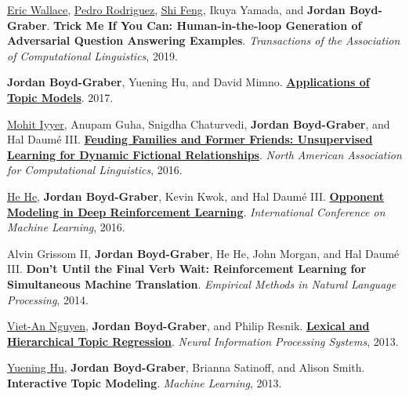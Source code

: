 \documentclass[10pt,a4paper]{article} %
\begin{document}
\begin{multicols}{2}  %

\small

\begin{enumerate*}

\item \underline{\href{http://www.ericswallace.com/}{Eric Wallace}}, \underline{\href{http://csel.cs.colorado.edu/~pero9922}{Pedro Rodriguez}}, \underline{\href{http://users.umiacs.umd.edu/~shifeng/}{Shi Feng}}, Ikuya Yamada, and {\bf Jordan Boyd-Graber}.  {\bf Trick Me If You Can: Human-in-the-loop Generation of Adversarial Question Answering Examples}.  \emph{Transactions of the Association of Computational Linguistics}, 2019.

\item {\bf Jordan Boyd-Graber}, Yuening Hu, and David Mimno.  {\bf \href{http://www.nowpublishers.com/article/Details/INR-030}{Applications of Topic Models}}.  2017.

\item \underline{Mohit Iyyer}, Anupam Guha, Snigdha Chaturvedi, {\bf Jordan Boyd-Graber}, and Hal {Daum\'{e} III}.  {\bf \href{http://cs.colorado.edu/~jbg//docs/2016_naacl_relationships.pdf}{Feuding Families and Former Friends: Unsupervised Learning for Dynamic Fictional Relationships}}.  \emph{North American Association for Computational Linguistics}, 2016.

	 \item \underline{\href{http://www.umiacs.umd.edu/~hhe/}{He He}}, {\bf Jordan Boyd-Graber}, Kevin Kwok, and Hal {Daum\'{e} III}.  {\bf \href{http://umiacs.umd.edu/~jbg//docs/2016_icml_opponent.pdf}{Opponent Modeling in Deep Reinforcement Learning}}.  \emph{International Conference on Machine Learning}, 2016.

\item Alvin {Grissom II}, {\bf Jordan Boyd-Graber}, He He, John Morgan, and Hal {Daum\'{e} III}.  {\bf Don't Until the Final Verb Wait: Reinforcement Learning for Simultaneous Machine Translation}.  \emph{Empirical Methods in Natural Language Processing}, 2014.

\item \underline{\href{http://www.cs.umd.edu/~vietan/index.htm}{Viet-An Nguyen}}, {\bf Jordan Boyd-Graber}, and Philip Resnik.  {\bf \href{http://umiacs.umd.edu/~jbg//docs/2013_shlda.pdf}{Lexical and Hierarchical Topic Regression}}.  \emph{Neural Information Processing Systems}, 2013.

\item \underline{Yuening Hu}, {\bf Jordan Boyd-Graber}, Brianna
  Satinoff, and Alison Smith.  {\bf Interactive Topic Modeling}.
  \emph{Machine Learning}, 2013.


\end{enumerate*}
\end{multicols}
\end{document}
